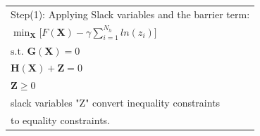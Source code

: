 \documentclass{beamer}
\begin{document}
\begin{frame}

\begin{center}
\begin{tabular}{|l|}
\hline
\rowcolor{yellow}
Step(1): Applying Slack variables and the barrier term: \\
\rowcolor{Gray}

$\min_{\mathbf{X}} \bigg[F(\mathbf{X})-\gamma\sum_{i=1}^{N_h}{ln(z_{i})}\bigg]$\\ \rowcolor{Gray}

 $\textrm{s.t. }  \mathbf{G}(\mathbf{X})=0$\\ \rowcolor{Gray}

$\mathbf{H}(\mathbf{X})+\mathbf{Z}=0$\\ \rowcolor{Gray}

 $\mathbf{Z}\geq 0$\\
\hline
slack variables "Z" convert inequality constraints\\
 to equality constraints.\\
\hline
\end{tabular}
\end{center}

\end{frame}
\end{document}
